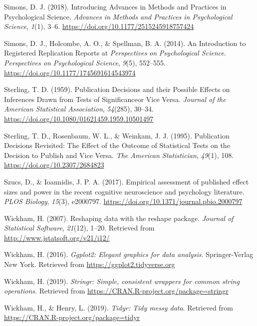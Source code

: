 \documentclass[british,,jou,floatsintext]{apa6}
\begin{document}
\leavevmode\hypertarget{ref-Simons2018}{}%
Simons, D. J. (2018). Introducing Advances in Methods and Practices in Psychological Science. \emph{Advances in Methods and Practices in Psychological Science}, \emph{1}(1), 3--6. \url{https://doi.org/10.1177/2515245918757424}

\leavevmode\hypertarget{ref-Simons2014}{}%
Simons, D. J., Holcombe, A. O., \& Spellman, B. A. (2014). An Introduction to Registered Replication Reports at \emph{Perspectives} \emph{on} \emph{Psychological Science}. \emph{Perspectives on Psychological Science}, \emph{9}(5), 552--555. \url{https://doi.org/10.1177/1745691614543974}

\leavevmode\hypertarget{ref-Sterling1959}{}%
Sterling, T. D. (1959). Publication Decisions and their Possible Effects on Inferences Drawn from Tests of Significanceor Vice Versa. \emph{Journal of the American Statistical Association}, \emph{54}(285), 30--34. \url{https://doi.org/10.1080/01621459.1959.10501497}

\leavevmode\hypertarget{ref-Sterling1995}{}%
Sterling, T. D., Rosenbaum, W. L., \& Weinkam, J. J. (1995). Publication Decisions Revisited: The Effect of the Outcome of Statistical Tests on the Decision to Publish and Vice Versa. \emph{The American Statistician}, \emph{49}(1), 108. \url{https://doi.org/10.2307/2684823}

\leavevmode\hypertarget{ref-Szucs2017}{}%
Szucs, D., \& Ioannidis, J. P. A. (2017). Empirical assessment of published effect sizes and power in the recent cognitive neuroscience and psychology literature. \emph{PLOS Biology}, \emph{15}(3), e2000797. \url{https://doi.org/10.1371/journal.pbio.2000797}

\leavevmode\hypertarget{ref-R-reshape2}{}%
Wickham, H. (2007). Reshaping data with the reshape package. \emph{Journal of Statistical Software}, \emph{21}(12), 1--20. Retrieved from \url{http://www.jstatsoft.org/v21/i12/}

\leavevmode\hypertarget{ref-R-ggplot2}{}%
Wickham, H. (2016). \emph{Ggplot2: Elegant graphics for data analysis}. Springer-Verlag New York. Retrieved from \url{https://ggplot2.tidyverse.org}

\leavevmode\hypertarget{ref-R-stringr}{}%
Wickham, H. (2019). \emph{Stringr: Simple, consistent wrappers for common string operations}. Retrieved from \url{https://CRAN.R-project.org/package=stringr}

\leavevmode\hypertarget{ref-R-tidyr}{}%
Wickham, H., \& Henry, L. (2019). \emph{Tidyr: Tidy messy data}. Retrieved from \url{https://CRAN.R-project.org/package=tidyr}
\end{document}
